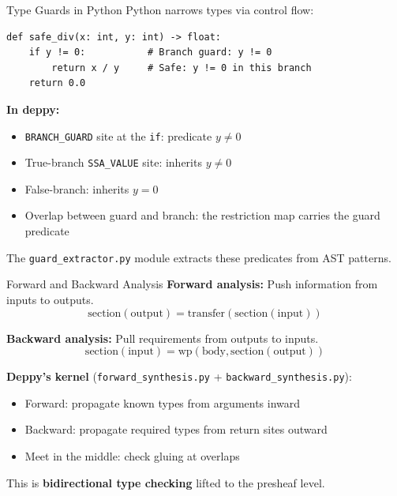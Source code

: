 \documentclass[aspectratio=169,10pt]{beamer}
\begin{document}
\begin{frame}[fragile]{Type Guards in Python}
Python narrows types via control flow:

\begin{lstlisting}
def safe_div(x: int, y: int) -> float:
    if y != 0:           # Branch guard: y != 0
        return x / y     # Safe: y != 0 in this branch
    return 0.0
\end{lstlisting}

\textbf{In deppy:}
\begin{itemize}
  \item \texttt{BRANCH\_GUARD} site at the \texttt{if}: predicate $y \neq 0$
  \item True-branch \texttt{SSA\_VALUE} site: inherits $y \neq 0$
  \item False-branch: inherits $y = 0$
  \item Overlap between guard and branch: the restriction map carries the guard predicate
\end{itemize}

The \texttt{guard\_extractor.py} module extracts these predicates from AST patterns.
\end{frame}

\begin{frame}{Forward and Backward Analysis}
\textbf{Forward analysis:} Push information from inputs to outputs.
\[
\text{section}(\text{output}) = \text{transfer}(\text{section}(\text{input}))
\]

\textbf{Backward analysis:} Pull requirements from outputs to inputs.
\[
\text{section}(\text{input}) = \text{wp}(\text{body}, \text{section}(\text{output}))
\]

\vspace{0.3em}
\textbf{Deppy's kernel} (\texttt{forward\_synthesis.py} + \texttt{backward\_synthesis.py}):
\begin{itemize}
  \item Forward: propagate known types from arguments inward
  \item Backward: propagate required types from return sites outward
  \item Meet in the middle: check gluing at overlaps
\end{itemize}

This is \textbf{bidirectional type checking} lifted to the presheaf level.
\end{frame}
\end{document}

